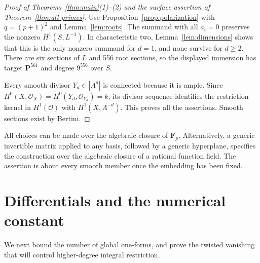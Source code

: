 \documentclass[11pt,a4paper]{article}
\newcommand{\OO}{\mathcal O}
\newcommand{\PP}{\mathbf P}
\theoremstyle{definition}\newtheorem{definition}[theorem]{Definition}
\theoremstyle{remark}\newtheorem{remark}[theorem]{Remark}
\numberwithin{equation}{section}
\begin{document}
\begin{proof}[Proof of Theorems~\ref{thm:main}(1)--(2) and the surface assertion of Theorem~\ref{thm:all-primes}]
Use Proposition~\ref{prop:polarization} with $q=(p+1)^2$ and Lemma~\ref{lem:roots}. The summand with all $a_i=0$ preserves the nonzero $H^1(S,L^{-1})$. In characteristic two, Lemma~\ref{lem:dimensions} shows that this is the only nonzero summand for $d=1$, and none survive for $d\ge2$. There are six sections of $L$ and 556 root sections, so the displayed immersion has target $\PP^{561}$ and degree $9^{556}$ over $S$.

Every smooth divisor $Y_d\in|A^d|$ is connected because it is ample. Since $H^0(X,\OO_X)=H^0(Y_d,\OO_{Y_d})=k$, its divisor sequence identifies the restriction kernel in $H^1(\OO)$ with $H^1(X,A^{-d})$. This proves all the assertions. Smooth sections exist by Bertini.
\end{proof}

All choices can be made over the algebraic closure of $\mathbf F_p$. Alternatively, a generic invertible matrix applied to any basis, followed by a generic hyperplane, specifies the construction over the algebraic closure of a rational function field. The assertion is about every smooth member once the embedding has been fixed.

\section{Differentials and the numerical constant}\label{sec:differentials}

We next bound the number of global one-forms, and prove the twisted vanishing that will control higher-degree integral restriction.
\end{document}
